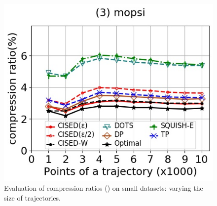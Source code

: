 \begin{figure}[tb!]
	\includegraphics[scale=0.348]{Figures/Exp-SED-CR-size-mopsi.jpg}		
	\vspace{-2ex}
	
	\caption{\small Evaluation of compression ratios (\sed) on small datasets: varying the size of
		trajectories.}
	\label{fig:cr-sed-size}
	\vspace{-2ex}
\end{figure}
